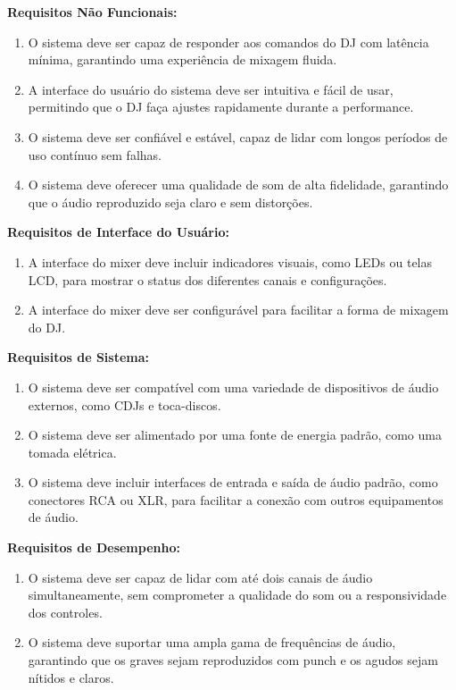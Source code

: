 \textbf{Requisitos Não Funcionais:}
\begin{enumerate}[label=\textbullet]
\item O sistema deve ser capaz de responder aos comandos do DJ com latência mínima, garantindo uma experiência de mixagem fluida.
\item A interface do usuário do sistema deve ser intuitiva e fácil de usar, permitindo que o DJ faça ajustes rapidamente durante a performance.
\item O sistema deve ser confiável e estável, capaz de lidar com longos períodos de uso contínuo sem falhas.
\item O sistema deve oferecer uma qualidade de som de alta fidelidade, garantindo que o áudio reproduzido seja claro e sem distorções.
\end{enumerate}

\textbf{Requisitos de Interface do Usuário:}
\begin{enumerate}[label=\textbullet]
\item A interface do mixer deve incluir indicadores visuais, como LEDs ou telas LCD, para mostrar o status dos diferentes canais e configurações.
\item  A interface do mixer deve ser configurável para facilitar a forma de mixagem do DJ.
\end{enumerate}

\textbf{Requisitos de Sistema:}
\begin{enumerate}[label=\textbullet]
\item O sistema deve ser compatível com uma variedade de dispositivos de áudio externos, como CDJs e toca-discos.
\item O sistema deve ser alimentado por uma fonte de energia padrão, como uma tomada elétrica.
\item O sistema deve incluir interfaces de entrada e saída de áudio padrão, como conectores RCA ou XLR, para facilitar a conexão com outros equipamentos de áudio.
\end{enumerate}

\textbf{Requisitos de Desempenho:}
\begin{enumerate}[label=\textbullet]
\item O sistema deve ser capaz de lidar com até dois canais de áudio simultaneamente, sem comprometer a qualidade do som ou a responsividade dos controles.
\item O sistema deve suportar uma ampla gama de frequências de áudio, garantindo que os graves sejam reproduzidos com punch e os agudos sejam nítidos e claros.
\end{enumerate}

